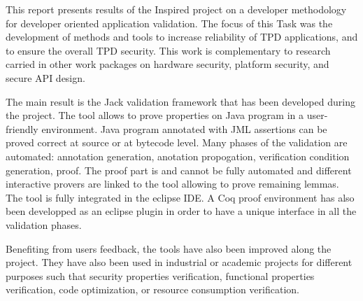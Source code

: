This report presents results of the Inspired project on a developer
methodology for developer oriented application validation. The focus
of this Task was the development of methods and tools to increase
reliability of TPD applications, and to ensure the overall TPD
security.  This work is complementary to research carried in other
work packages on hardware security, platform security, and secure API
design.

The main result is the Jack validation framework that has been
developed during the project. The tool allows to prove properties on
Java program in a user-friendly environment. Java program annotated
with JML assertions can be proved correct at source or at bytecode
level. Many phases of the validation are automated: annotation
generation, anotation propogation, verification condition generation,
proof. The proof part is and cannot be fully automated and different
interactive provers are linked to the tool allowing to prove remaining
lemmas. The tool is fully integrated in the eclipse IDE. A Coq proof
environment has also been developped as an eclipse plugin in order to
have a unique interface in all the validation phases.


Benefiting from users feedback, the tools have also been improved
along the project. They have also been used in industrial or academic
projects for different purposes such that security properties
verification, functional properties verification, code optimization,
or resource consumption verification.

